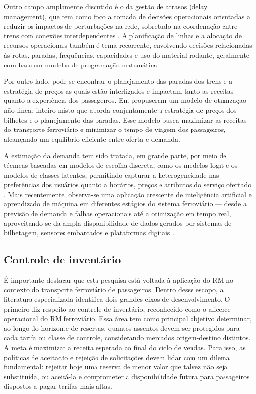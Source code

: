 Outro campo amplamente discutido é o da gestão de atrasos (delay management), que tem como foco a tomada de decisões operacionais orientadas a reduzir os impactos de perturbações na rede, sobretudo na coordenação entre trens com conexões interdependentes \citep{Konig2020}. A planificação de linhas e a alocação de recursos operacionais também é tema recorrente, envolvendo decisões relacionadas às rotas, paradas, frequências, capacidades e uso do material rodante, geralmente com base em modelos de programação matemática \citep{Huisman_2005, Shan2024}.

Por outro lado, pode-se encontrar o planejamento das paradas dos trens e a estratégia de preços as quais estão interligados e impactam tanto as receitas quanto a experiência dos passageiros. Em \citep{zhou2022nonlinear} propuseram um modelo de otimização não linear inteiro misto que aborda conjuntamente a estratégia de preços dos bilhetes e o planejamento das paradas. Esse modelo busca maximizar as receitas do transporte ferroviário e minimizar o tempo de viagem dos passageiros, alcançando um equilíbrio eficiente entre oferta e demanda.

A estimação da demanda tem sido tratada, em grande parte, por meio de técnicas baseadas em modelos de escolha discreta, como os modelos logit e os modelos de classes latentes, permitindo capturar a heterogeneidade nas preferências dos usuários quanto a horários, preços e atributos do serviço ofertado \citep{HETRAKUL201468, TANG2022}. Mais recentemente, observa-se uma aplicação crescente de inteligência artificial e aprendizado de máquina em diferentes estágios do sistema ferroviário — desde a previsão de demanda e falhas operacionais até a otimização em tempo real, aproveitando-se da ampla disponibilidade de dados gerados por sistemas de bilhetagem, sensores embarcados e plataformas digitais \citep{Besinovic2022, TANG2022}.

\subsection{Controle de inventário}

É importante destacar que esta pesquisa está voltada à aplicação do RM no contexto do transporte ferroviário de passageiros. Dentro desse escopo, a literatura especializada identifica dois grandes eixos de desenvolvimento. O primeiro diz respeito ao controle de inventário, reconhecido como o alicerce operacional do RM ferroviário. Essa área tem como principal objetivo determinar, ao longo do horizonte de reservas, quantos assentos devem ser protegidos para cada tarifa ou classe de controle, considerando mercados origem-destino distintos. A meta é maximizar a receita esperada ao final do ciclo de vendas. Para isso, as políticas de aceitação e rejeição de solicitações devem lidar com um dilema fundamental: rejeitar hoje uma reserva de menor valor que talvez não seja substituída, ou aceitá-la e comprometer a disponibilidade futura para passageiros dispostos a pagar tarifas mais altas.

